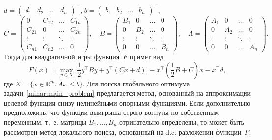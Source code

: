 $d =
  \begin{pmatrix}
  	d_1 & d_2 & \dots & d_n
  \end{pmatrix}^\top
$, %
$b =
  \begin{pmatrix}
  	b_1 & b_2 & \dots & b_n
  \end{pmatrix}^\top
$,
\begin{equation*}
  C =
  \begin{pmatrix}
    0 & C_{12} & \dots & C_{1n} \\
    C_{21} & 0 & \dots & C_{2n} \\
    \vdots & \vdots & \ddots & \vdots \\
    C_{n1} & C_{n2} & \dots & 0
  \end{pmatrix}
  ,\quad
  B =
  \begin{pmatrix}
    B_{1} & 0 & \dots & 0 \\
    0 & B_{2} & \dots & 0 \\
    \vdots & \vdots & \ddots & \vdots \\
    0 & 0 & \dots & B_{n}
  \end{pmatrix}
  ,\quad
  A =
  \begin{pmatrix}
    A_{1} & 0 & \dots & 0 \\
    0 & A_{2} & \dots & 0 \\
    \vdots & \vdots & \ddots & \vdots \\
    0 & 0 & \dots & A_{n}
  \end{pmatrix}
  .
\end{equation*}
Тогда для квадратичной игры функция~$F$ примет вид
\begin{equation*}
	F(x) = \max_{y\in X} \bigg[\frac{1}{2} y^\top By + y^\top (Cx+d) \bigg] - x^\top \left( \frac{1}{2}B+C \right) x - x^\top d,
\end{equation*}
где	$X = \{x \in \mathbb{R}^{m} \colon A x \leq b \}$. Для поиска глобального оптимума задачи~\eqref{minar:main_problem} предлагается метод, основанный на аппроксимации целевой функции снизу нелинейными опорными функциями. Если дополнительно предположить, что функции выигрыша строго вогнуты по собственным переменным, т.~е. матрицы $B_1, \dots, B_n$ отрицательно определены, то может быть рассмотрен метод локального поиска, основанный на d.c.-разложении функции~$F$.


%



